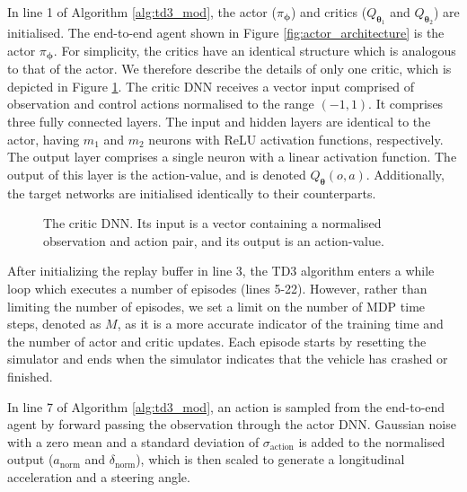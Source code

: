 In line 1 of Algorithm \ref{alg:td3_mod}, the actor ($\pi_{\bm{\phi}}$) and critics ($Q_{\bm{\theta}_1}$ and $Q_{\bm{\theta}_2}$) are initialised.
The end-to-end agent shown in Figure \ref{fig:actor_architecture} is the actor $\pi_{\bm{\phi}}$.
For simplicity, the critics have an identical structure which is analogous to that of the actor.
We therefore describe the details of only one critic, which is depicted in Figure \ref{fig:critic_architecture}.
The critic DNN receives a vector input comprised of observation and control actions normalised to the range $(-1,1)$. 
It comprises three fully connected layers.
The input and hidden layers are identical to the actor, having $m_1$ and $m_2$ neurons with ReLU activation functions, respectively.
The output layer comprises a single neuron with a linear activation function.
The output of this layer is the action-value, and is denoted $Q_{\bm{\theta}}(o,a)$.
Additionally, the target networks are initialised identically to their counterparts.

\begin{figure}[htb!]
    \centering
    
    \caption[The critic DNN]{The critic DNN. Its input is a vector containing a normalised observation and action pair, and its output is an action-value.}
    \label{fig:critic_architecture}
\end{figure}

After initializing the replay buffer in line 3, the TD3 algorithm enters a while loop which executes a number of episodes (lines 5-22). 
However, rather than limiting the number of episodes, we set a limit on the number of MDP time steps, denoted as $M$, as it is a more accurate indicator of the training time and the number of actor and critic updates. 
Each episode starts by resetting the simulator and ends when the simulator indicates that the vehicle has crashed or finished.


In line 7 of Algorithm \ref{alg:td3_mod}, an action is sampled from the end-to-end agent by forward passing the observation through the actor DNN.
Gaussian noise with a zero mean and a standard deviation of $\sigma_{\text{action}}$ is added to the normalised output ($a_{\text{norm}}$ and $\delta_{\text{norm}}$), which is then scaled to generate a longitudinal acceleration and a steering angle.

